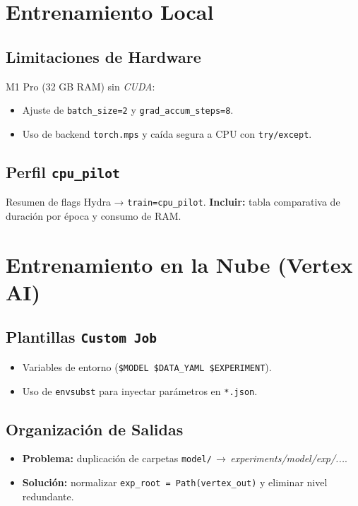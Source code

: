 \section{Entrenamiento Local}\label{sec:entrenamiento_local}
\subsection{Limitaciones de Hardware}
M1 Pro (32 GB RAM) sin \emph{CUDA}:
\begin{itemize}
   \item Ajuste de \texttt{batch\_size=2} y
         \texttt{grad\_accum\_steps=8}.
   \item Uso de backend \texttt{torch.mps} y
         caída segura a CPU con \texttt{try/except}.
\end{itemize}

\subsection{Perfil \texttt{cpu\_pilot}}
Resumen de flags Hydra → \texttt{train=cpu\_pilot}.
\textbf{Incluir:} tabla comparativa de duración
por época y consumo de RAM.

\section{Entrenamiento en la Nube (Vertex AI)}\label{sec:vertex_ai}
\subsection{Plantillas \texttt{Custom Job}}\label{ssec:job_templates}
\begin{itemize}
   \item Variables de entorno (\verb|$MODEL $DATA_YAML $EXPERIMENT|).
   \item Uso de \texttt{envsubst} para inyectar
         parámetros en \texttt{*.json}.
\end{itemize}

\subsection{Organización de Salidas}\label{ssec:dirs}
\begin{itemize}
   \item \textbf{Problema:} duplicación de carpetas
         \texttt{model/}\,$\rightarrow$\,\textit{experiments/model/exp/...}.
   \item \textbf{Solución:} normalizar
         \verb|exp_root = Path(vertex_out)| y eliminar nivel redundante.
\end{itemize}

